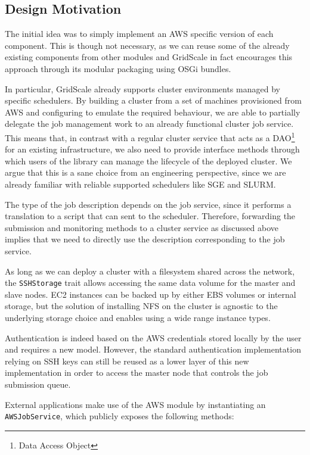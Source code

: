 \subsection{Design Motivation} \label{DesignMotivationSection}

The initial idea was to simply implement an AWS specific version of each component. This is though not necessary, as we can reuse some of the already existing components from other modules and GridScale in fact encourages this approach through its modular packaging using OSGi bundles.

In particular, GridScale already supports cluster environments managed by specific schedulers. By building a cluster from a set of machines provisioned from AWS and configuring to emulate the required behaviour, we are able to partially delegate the job management work to an already functional cluster job service. This means that, in contrast with a regular cluster service that acts as a DAO\footnote{Data Access Object} for an existing infrastructure, we also need to provide interface methods through which users of the library can manage the lifecycle of the deployed cluster. We argue that this is a sane choice from an engineering perspective, since we are already familiar with reliable supported schedulers like SGE and SLURM.

The type of the job description depends on the job service, since it performs a translation to a script that can sent to the scheduler. Therefore, forwarding the submission and monitoring methods to a cluster service as discussed above implies that we need to directly use the description corresponding to the job service.

As long as we can deploy a cluster with a filesystem shared across the network, the \verb|SSHStorage| trait allows accessing the same data volume for the master and slave nodes. EC2 instances can be backed up by either EBS volumes or internal storage, but the solution of installing NFS on the cluster is agnostic to the underlying storage choice and enables using a wide range instance types.

Authentication is indeed based on the AWS credentials stored locally by the user and requires a new model. However, the standard authentication implementation relying on SSH keys can still be reused as a lower layer of this new implementation in order to access the master node that controls the job submission queue.

External applications make use of the AWS module by instantiating an \verb|AWSJobService|, which publicly exposes the following methods:


